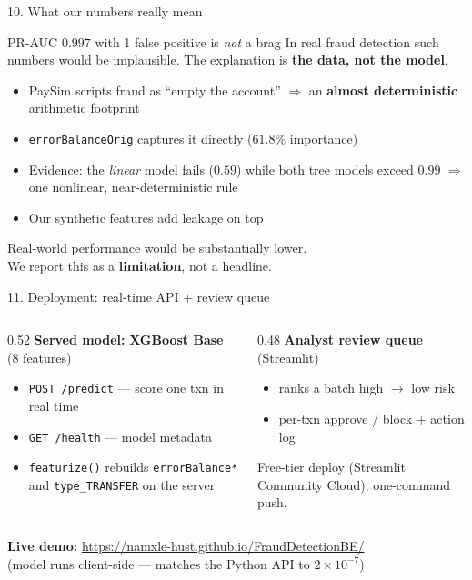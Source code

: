 \documentclass[aspectratio=169]{beamer}
\newcommand{\good}[1]{\textcolor{good}{\textbf{#1}}}
\newcommand{\warn}[1]{\textcolor{hustdark}{\textbf{#1}}}
\begin{document}
\begin{frame}{10. What our numbers really mean}
\begin{alertblock}{PR-AUC $0.997$ with 1 false positive is \emph{not} a brag}
In real fraud detection such numbers would be implausible.
The explanation is \warn{the data, not the model}.
\end{alertblock}

\begin{itemize}
    \item PaySim scripts fraud as ``empty the account'' $\Rightarrow$ an
    \textbf{almost deterministic} arithmetic footprint
    \item \texttt{errorBalanceOrig} captures it directly ($61.8\%$ importance)
    \item Evidence: the \emph{linear} model fails ($0.59$) while both tree
    models exceed $0.99$ $\Rightarrow$ one nonlinear, near-deterministic rule
    \item Our synthetic features add leakage on top
\end{itemize}

\vspace{0.5em}
\centering
\alert{Real-world performance would be substantially lower.}\\
We report this as a \textbf{limitation}, not a headline.
\end{frame}

\begin{frame}{11. Deployment: real-time API + review queue}
\begin{columns}[T]
\begin{column}{0.52\textwidth}
\textbf{Served model:} \good{XGBoost Base} (8 features)
\begin{itemize}
    \item \texttt{POST /predict} --- score one txn in real time
    \item \texttt{GET /health} --- model metadata
    \item \texttt{featurize()} rebuilds \texttt{errorBalance*} and
    \texttt{type\_TRANSFER} on the server
\end{itemize}
\end{column}
\begin{column}{0.48\textwidth}
\textbf{Analyst review queue} (Streamlit)
\begin{itemize}
    \item ranks a batch high $\to$ low risk
    \item per-txn approve / block $+$ action log
\end{itemize}
\vspace{0.4em}
Free-tier deploy (Streamlit Community Cloud), one-command push.
\end{column}
\end{columns}
\vspace{0.5em}
\centering
\good{Live demo:} \url{https://namxle-hust.github.io/FraudDetectionBE/}\\
{\footnotesize (model runs client-side --- matches the Python API to $2\times10^{-7}$)}
\end{frame}
\end{document}
